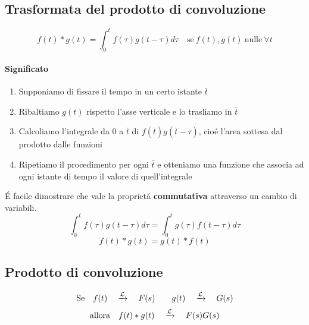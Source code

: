 \documentclass[../main.tex]{subfiles}
\begin{document}
	\subsection{Trasformata del prodotto di convoluzione}
	\begin{equation}
		f(t) * g(t) = \int_{0}^{t} f(\tau)g(t-\tau) d\tau \quad \text{se}\ f(t), g(t)\ \text{nulle}\ \forall t
	\end{equation}
	\paragraph{Significato}
	\begin{enumerate}
		\item Supponiamo di fissare il tempo in un certo istante $\bar{t}$
		\item Ribaltiamo $g(t)$ rispetto l'asse verticale e lo trasliamo in $\bar{t}$
		\item Calcoliamo l'integrale da 0 a $\bar{t}$ di $f(\bar{t})g(\bar{t}-\tau)$, cio\'{e} l'area sottesa dal prodotto dalle funzioni
		\item Ripetiamo il procedimento per ogni $\bar{t}$ e otteniamo una funzione che associa ad ogni istante di tempo il valore di quell'integrale
	\end{enumerate}
	\'{E} facile dimostrare che vale la propriet\'{a} \textbf{commutativa} attraverso un cambio di variabili. \label{conv_comm}
	$$ \int_{0}^{t} f(\tau)g(t-\tau) d\tau = \int_{0}^{t} g(\tau)f(t-\tau) d\tau $$
	$$ f(t)*g(t) = g(t)*f(t) $$
	\subsection{Prodotto di convoluzione}
	$$ \text{Se} \quad f(t) \quad \xrightarrow{\mathcal{L}} \quad F(s) \qquad g(t) \quad \xrightarrow{\mathcal{L}} \quad G(s) $$
	$$ \text{allora} \quad f(t)*g(t) \quad \xrightarrow{\mathcal{L}} \quad F(s)G(s) $$
\end{document}
